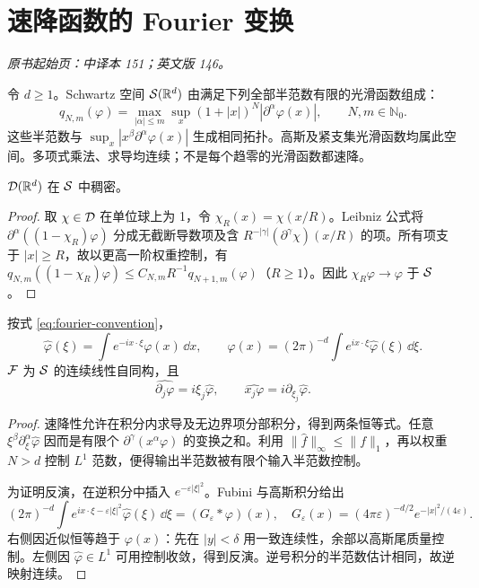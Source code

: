 \section{速降函数的 Fourier 变换}\label{sec:yosida-06-01}
\noindent\textit{原书起始页：中译本 151；英文版 146。}

令 $d\ge1$。Schwartz 空间 $\mathcal{S}(\mathbb R^d)$ 由满足下列全部半范数有限的光滑函数组成：
\[
 q_{N,m}(\varphi)=\max_{|\alpha|\le m}\sup_x(1+|x|)^N|\partial^\alpha\varphi(x)|,
 \qquad N,m\in\mathbb N_0.
\]
这些半范数与 $\sup_x|x^\beta\partial^\alpha\varphi(x)|$ 生成相同拓扑。高斯及紧支集光滑函数均属此空间。多项式乘法、求导均连续；不是每个趋零的光滑函数都速降。

\begin{proposition}[紧支集探针稠密]
$\mathcal{D}(\mathbb R^d)$ 在 $\mathcal{S}$ 中稠密。
\end{proposition}
\begin{proof}
取 $\chi\in\mathcal{D}$ 在单位球上为 1，令 $\chi_R(x)=\chi(x/R)$。Leibniz 公式将 $\partial^\alpha((1-\chi_R)\varphi)$ 分成无截断导数项及含 $R^{-|\gamma|}(\partial^\gamma\chi)(x/R)$ 的项。所有项支于 $|x|\ge R$，故以更高一阶权重控制，有
$q_{N,m}((1-\chi_R)\varphi)\le C_{N,m}R^{-1}q_{N+1,m}(\varphi)$（$R\ge1$）。因此 $\chi_R\varphi\to\varphi$ 于 $\mathcal{S}$。
\end{proof}

\begin{theorem}\label{thm:y6-fourier}
按式 \eqref{eq:fourier-convention}，
\[
 \widehat\varphi(\xi)=\int e^{-ix\cdot\xi}\varphi(x)\,\dd x,
 \qquad \varphi(x)=(2\pi)^{-d}\int e^{ix\cdot\xi}\widehat\varphi(\xi)\,\dd\xi.
\]
$\mathcal{F}$ 为 $\mathcal{S}$ 的连续线性自同构，且
\[
 \widehat{\partial_j\varphi}=i\xi_j\widehat\varphi,
 \qquad\widehat{x_j\varphi}=i\partial_{\xi_j}\widehat\varphi.
\]
\end{theorem}
\begin{proof}
速降性允许在积分内求导及无边界项分部积分，得到两条恒等式。任意 $\xi^\beta\partial_\xi^\alpha\widehat\varphi$ 因而是有限个 $\partial^\gamma(x^\alpha\varphi)$ 的变换之和。利用 $\|\widehat f\|_\infty\le\|f\|_1$，再以权重 $N>d$ 控制 $L^1$ 范数，便得输出半范数被有限个输入半范数控制。

为证明反演，在逆积分中插入 $e^{-\varepsilon|\xi|^2}$。Fubini 与高斯积分给出
\[
 (2\pi)^{-d}\int e^{ix\cdot\xi-\varepsilon|\xi|^2}\widehat\varphi(\xi)\,\dd\xi
 =(G_\varepsilon*\varphi)(x),\quad
 G_\varepsilon(x)=(4\pi\varepsilon)^{-d/2}e^{-|x|^2/(4\varepsilon)}.
\]
右侧因近似恒等趋于 $\varphi(x)$：先在 $|y|<\delta$ 用一致连续性，余部以高斯尾质量控制。左侧因 $\widehat\varphi\in L^1$ 可用控制收敛，得到反演。逆号积分的半范数估计相同，故逆映射连续。
\end{proof}

